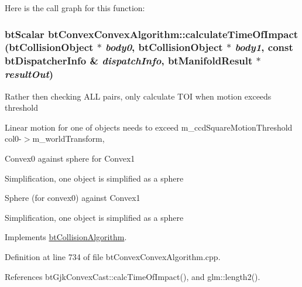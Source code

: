 Here is the call graph for this function:\hypertarget{classbt_convex_convex_algorithm_55f817b690c4e858d2b02607b382ce6b}{
\subsubsection[calculateTimeOfImpact]{\setlength{\rightskip}{0pt plus 5cm}btScalar btConvexConvexAlgorithm::calculateTimeOfImpact (btCollisionObject $\ast$ {\em body0}, \/  btCollisionObject $\ast$ {\em body1}, \/  const btDispatcherInfo \& {\em dispatchInfo}, \/  {\bf btManifoldResult} $\ast$ {\em resultOut})}}
\label{classbt_convex_convex_algorithm_55f817b690c4e858d2b02607b382ce6b}




Rather then checking ALL pairs, only calculate TOI when motion exceeds threshold

Linear motion for one of objects needs to exceed m\_\-ccdSquareMotionThreshold col0-$>$m\_\-worldTransform,

Convex0 against sphere for Convex1

Simplification, one object is simplified as a sphere

Sphere (for convex0) against Convex1

Simplification, one object is simplified as a sphere 

Implements \hyperlink{classbt_collision_algorithm}{btCollisionAlgorithm}.

Definition at line 734 of file btConvexConvexAlgorithm.cpp.

References btGjkConvexCast::calcTimeOfImpact(), and glm::length2().

